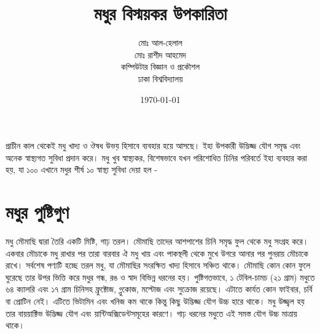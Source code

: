 \documentclass{article}
\title{মধুর বিস্ময়কর উপকারিতা}
\author{মোঃ আল-হেলাল\\মোঃ রাশীদ আহমেদ\\ কম্পিউটার বিজ্ঞান ও প্রকৌশল\\ ঢাকা বিশ্ববিদ্যালয়}
\date{\today}
\begin{document}
\maketitle

প্রাচীন কাল থেকেই মধু খাদ্য ও ঔষধ উভয় হিসাবে ব্যবহার হয়ে আসছে। ইহা উপকারী উদ্ভিজ্জ যৌগ সমৃদ্ধ এবং অনেক স্বাস্থ্যগত সুবিধা প্রদান করে। মধু খুব স্বাস্থ্যকর, বিশেষভাবে যখন পরিশোধিত চিনির পরিবর্তে ইহা ব্যবহার করা হয়, যা ১০০%
এখানে মধুর শীর্ষ ১০ স্বাস্থ্য সুবিধা দেয়া হল -\\

\section{মধুর পুষ্টিগুণ}
মধু মৌমাছি দ্বারা তৈরি একটি মিষ্টি, গাঢ় তরল। মৌমাছি তাদের আশপাশের চিনি সমৃদ্ধ ফুল থেকে মধু সংগ্রহ করে। একবার মৌচাকে মধু রাখার পর তারা বারবার ঐ মধু খায় এবং পাকস্থলী থেকে মুখে উগরে আনার পর পুনরায় মৌচাকে রাখে। সর্বশেষ পণ্যটি হচ্ছে তরল মধু, যা মৌমাছির সংরক্ষিত খাদ্য হিসাবে সঞ্চিত থাকে। মৌমাছি কোন কোন ফুলে ঘুরেছে তার উপর ভিত্তি করে মধুর গন্ধ, রঙ ও স্বাদ বিভিন্ন ধরনের হয়। পুষ্টিগতভাবে, ১ টেবিল-চামচ (২১ গ্রাম) মধুতে ৬৪ ক্যালরি এবং ১৭ গ্রাম চিনিসহ ফ্রুক্টোজ, গ্লুকোজ, মল্টোজ এবং সুক্রোজ রয়েছে। এটাতে কার্যত কোন ফাইবার, চর্বি বা প্রোটিন নেই। এটিতে ভিটামিন এবং খনিজ কম থাকে কিন্তু কিছু উদ্ভিজ্জ যৌগ উচ্চ হারে থাকে। মধু উজ্জ্বল হয় তার বায়য়াক্টিভ উদ্ভিজ্জ যৌগ এবং য়ান্টিঅক্সিডেন্টসমূহের কারণে। গাঢ় ধরনের মধুতে এই সমস্ত যৌগ উচ্চ মাত্রায় থাকে।
\end{document}
